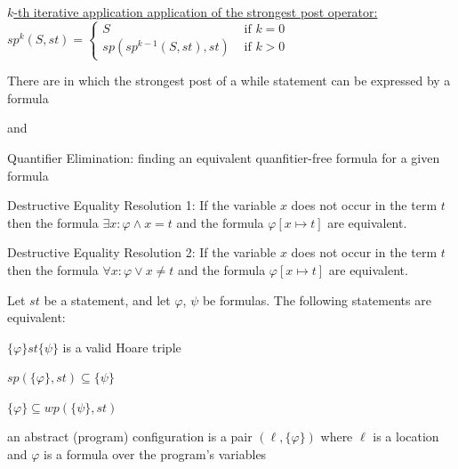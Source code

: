 \documentclass[landscape, a4paper]{article}
\begin{document}
\begin{minipage}[t]{0.2\linewidth}
\begin{betterlist}
\begin{betterlist}
\begin{betterlist}
				\begin{betterlist}
					\item \uline{$k$-th iterative application application of the strongest post operator:}\\ $s p^k(S, s t)= \begin{cases}S & \text { if } k=0 \\ s p\left(s p^{k-1}(S, s t), s t\right) & \text { if } k>0\end{cases}$
				\end{betterlist}
				\item There are  in which the strongest post of a while statement can be expressed by a formula
			\end{betterlist}
			\item {} and 
		\end{betterlist}
		\item \alert{Quantifier Elimination:} finding an equivalent quanfitier-free formula for a given formula
		\begin{betterlist}
			\item \alert{Destructive Equality Resolution 1:} If the variable $x$ does not occur in the term $t$ then the formula $\exists x:\varphi \land x = t$ and the formula $\varphi[x \mapsto t]$ are equivalent. 
			\item \alert{Destructive Equality Resolution 2:} If the variable $x$ does not occur in the term $t$ then the formula $\forall x:\varphi \lor x \ne t$ and the formula $\varphi[x\mapsto t]$ are equivalent. 
		\end{betterlist}
		\item Let $st$ be a statement, and let $\varphi$, $\psi$ be formulas. The following statements are equivalent:
		\begin{betterlist}
			\item $\{\varphi\} st \{\psi\}$ is a valid Hoare triple
			\item $sp(\{\varphi\}, st) \subseteq \{\psi\}$
			\item $\{\varphi\} \subseteq wp(\{\psi\}, st)$
		\end{betterlist}
	\end{betterlist}
	\fbox{Bounded Model Checking}
	\begin{betterlist}
		\item an \alert{abstract (program) configuration} is a pair $(\ell, \{\varphi\})$ where $\ell$ is a location and $\varphi$ is a formula over the program’s variables

\end{betterlist}
\end{minipage}
\end{document}
